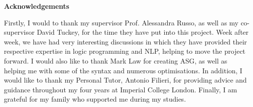 \newenvironment{acknowledgements}
    {\thispagestyle{plain}\null\vfill\begin{center}
    \bfseries Acknowledgements\end{center}}
    {\vfill\null}
        \begin{acknowledgements}
        Firstly, I would to thank my supervisor Prof. Alessandra Russo, as well as my co-supervisor David Tuckey, for the time they have put into this project. Week after week, we have had very interesting discussions in which they have provided their respective expertise in logic programming and NLP, helping to move the project forward. I would also like to thank Mark Law for creating ASG, as well as helping me with some of the syntax and numerous optimisations. In addition, I would like to thank my Personal Tutor, Antonio Filieri, for providing advice and guidance throughout my four years at Imperial College London. Finally, I am grateful for my family who supported me during my studies.
        \end{acknowledgements}